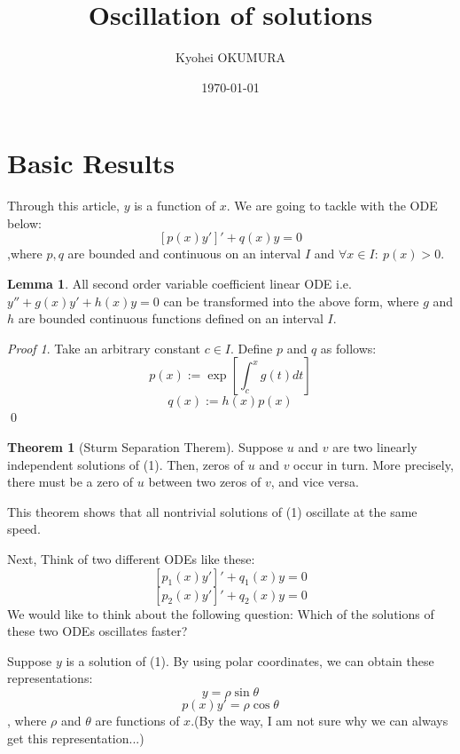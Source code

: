 \documentclass[11pt,a4paper]{amsart}
\theoremstyle{definition}
\newtheorem{thm}{Theorem}
\newtheorem{lem}{Lemma}
\theoremstyle{definition}
\theoremstyle{remark}
\newtheorem{prf}{Proof}
\begin{document}
\title{Oscillation of solutions}
\author{Kyohei OKUMURA}
\date{\today}

\maketitle
\section{Basic Results}

Through this article, $y$ is a function of $x$. We are going to tackle with the ODE below:
\begin{equation}
\displaystyle{ [p(x)y']' + q(x)y = 0} 
\end{equation}
,where $p,q$ are bounded and continuous on an interval $I$ and $\forall x \in I : \ p(x)>0.$

\begin{lem}
All second order variable coefficient linear ODE i.e. $y'' + g(x)y' + h(x)y = 0 $ can be transformed into the above form, where $g$ and $h$ are bounded continuous functions defined on an interval $I$.
\end{lem}
\begin{prf}
Take an arbitrary constant $c \in I$. Define $p$ and $q$ as follows:
$$p(x):=\exp[\int_c^x g(t)dt]$$
$$q(x):=h(x)p(x)$$
\qed
\end{prf}

\begin{thm}[Sturm Separation Therem]
Suppose $u$ and $v$ are two linearly independent solutions of (1). Then, zeros of $u$ and $v$ occur in turn. More precisely, there must be a zero of $u$ between two zeros of $v$, and vice versa. 
\end{thm}
This theorem shows that all nontrivial solutions of (1) oscillate at the same speed.

Next, Think of two different ODEs like these:
\begin{equation}
\displaystyle{ [p_1(x)y']' + q_1(x)y = 0}
\end{equation}
\begin{equation}
\displaystyle{ [p_2(x)y']' + q_2(x)y = 0}
\end{equation}
We would like to think about the following question: Which of the solutions of these two ODEs oscillates faster?

Suppose $y$ is a solution of (1). By using polar coordinates, we can obtain these representations:
\begin{equation}
\displaystyle{ y = \rho \sin \theta}
\end{equation}
\begin{equation}
\displaystyle{ p(x)y' = \rho \cos \theta}
\end{equation}
, where $\rho$ and $\theta$ are functions of $x$.(By the way, I am not sure why we can always get this representation...) 
\end{document}
